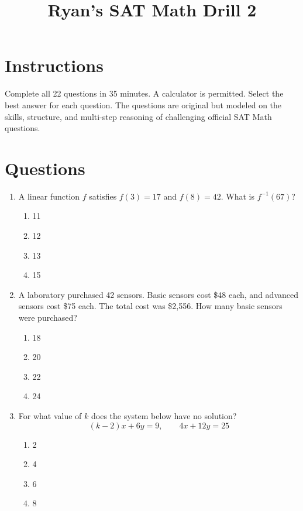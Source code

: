 \documentclass[12pt]{article}
\title{Ryan's SAT Math Drill 2}
\author{}
\date{}
\begin{document}
\maketitle

\section*{Instructions}
Complete all 22 questions in 35 minutes. A calculator is permitted. Select the best answer for each question. The questions are original but modeled on the skills, structure, and multi-step reasoning of challenging official SAT Math questions.

\section*{Questions}
\begin{enumerate}[leftmargin=*,itemsep=1.15em]
  \item A linear function $f$ satisfies $f(3)=17$ and $f(8)=42$. What is $f^{-1}(67)$?
  \begin{enumerate}[label=\Alph*.,itemsep=0pt]
    \item 11 \item 12 \item 13 \item 15
  \end{enumerate}

  \item A laboratory purchased 42 sensors. Basic sensors cost \$48 each, and advanced sensors cost \$75 each. The total cost was \$2,556. How many basic sensors were purchased?
  \begin{enumerate}[label=\Alph*.,itemsep=0pt]
    \item 18 \item 20 \item 22 \item 24
  \end{enumerate}

  \item For what value of $k$ does the system below have no solution?
  \[
    (k-2)x+6y=9,
    \qquad
    4x+12y=25
  \]
  \begin{enumerate}[label=\Alph*.,itemsep=0pt]
    \item 2 \item 4 \item 6 \item 8
  \end{enumerate}


\end{enumerate}
\end{document}
